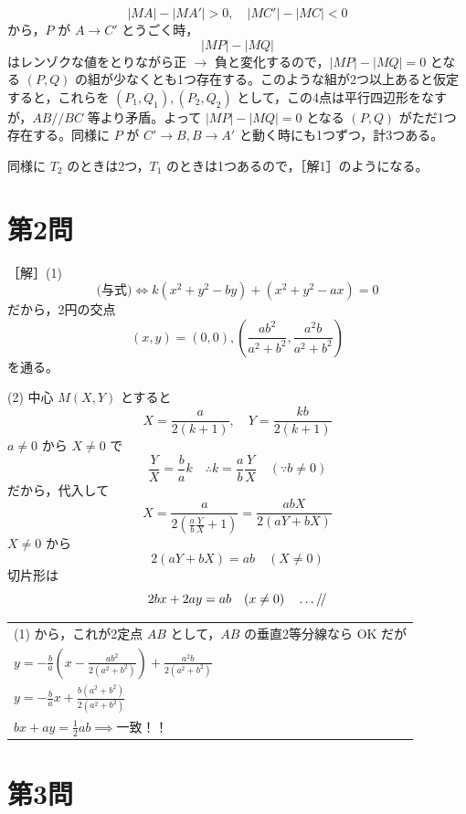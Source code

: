 \documentclass[../main.tex]{subfiles}
\begin{document}
\[
  |MA| - |MA'| > 0, \quad |MC'| - |MC| < 0
\]
から，$P$ が $A \to C'$ とうごく時，
\[
  |MP| - |MQ|
\]
はレンゾクな値をとりながら正 $\to$ 負と変化するので，$|MP| - |MQ| = 0$ となる $(P, Q)$ の組が少なくとも1つ存在する。このような組が2つ以上あると仮定すると，これらを $(P_1, Q_1), (P_2, Q_2)$ として，この4点は平行四辺形をなすが，$AB \mathbin{/\!/} BC$ 等より矛盾。よって $|MP| - |MQ| = 0$ となる $(P, Q)$ がただ1つ存在する。同様に $P$ が $C' \to B, B \to A'$ と動く時にも1つずつ，計3つある。

同様に $T_2$ のときは2つ，$T_1$ のときは1つあるので，［解1］のようになる。

\newpage

\section*{第2問}

［解］(1)
\[
  \text{(与式)} \iff k(x^2 + y^2 - by) + (x^2 + y^2 - ax) = 0
\]
だから，2円の交点
\[
  (x, y) = (0, 0), \left( \frac{ab^2}{a^2+b^2}, \frac{a^2 b}{a^2+b^2} \right)
\]
を通る。

(2) 中心 $M(X, Y)$ とすると
\[
  X = \frac{a}{2(k+1)}, \quad Y = \frac{kb}{2(k+1)}
\]
$a \ne 0$ から $X \ne 0$ で
\[
  \frac{Y}{X} = \frac{b}{a} k \quad \therefore k = \frac{a}{b} \frac{Y}{X} \quad (\because b \ne 0)
\]
だから，代入して
\[
  X = \frac{a}{2\left( \frac{a}{b} \frac{Y}{X} + 1 \right)} = \frac{abX}{2(aY + bX)}
\]
$X \ne 0$ から
\[
  2(aY + bX) = ab \quad (X \ne 0)
\]
切片形は
\[
  2bx + 2ay = ab \quad (x \ne 0) \quad \dots \text{/\!/}
\]

\begin{center}
  \begin{tabular}{|l|}
    \hline
    (1) から，これが2定点 $AB$ として，$AB$ の垂直2等分線なら OK だが \\
    \quad $y = -\frac{b}{a} \left( x - \frac{ab^2}{2(a^2+b^2)} \right) + \frac{a^2 b}{2(a^2+b^2)}$ \\
    \quad $y = -\frac{b}{a} x + \frac{b(a^2+b^2)}{2(a^2+b^2)}$ \\
    \quad $bx + ay = \frac{1}{2} ab \implies \text{一致！！}$ \\
    \hline
  \end{tabular}
\end{center}

\newpage

\section*{第3問}
\end{document}
